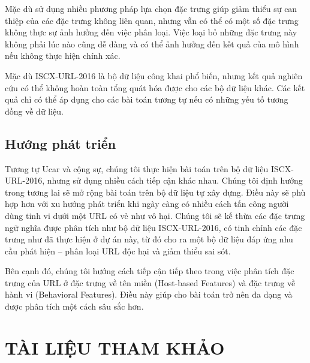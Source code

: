 \documentclass[13pt]{article}
\begin{document}
Mặc dù sử dụng nhiều phương pháp lựa chọn đặc trưng giúp giảm thiểu sự can thiệp của các đặc trưng không liên quan, nhưng vẫn có thể có một số đặc trưng không thực sự ảnh hưởng đến việc phân loại. Việc loại bỏ những đặc trưng này không phải lúc nào cũng dễ dàng và có thể ảnh hưởng đến kết quả của mô hình nếu không thực hiện chính xác.

Mặc dù ISCX-URL-2016 là bộ dữ liệu công khai phổ biến, nhưng kết quả nghiên cứu có thể không hoàn toàn tổng quát hóa được cho các bộ dữ liệu khác. Các kết quả chỉ có thể áp dụng cho các bài toán tương tự nếu có những yếu tố tương đồng về dữ liệu.

\subsection{Hướng phát triển}
Tương tự Ucar và cộng sự, chúng tôi thực hiện bài toán trên bộ dữ liệu ISCX-URL-2016, nhưng sử dụng nhiều cách tiếp cận khác nhau. Chúng tôi định hướng trong tương lai sẽ mở rộng bài toán trên bộ dữ liệu tự xây dựng. Điều này sẽ phù hợp hơn với xu hướng phát triển khi ngày càng có nhiều cách tấn công người dùng tinh vi dưới một URL có vẻ như vô hại. Chúng tôi sẽ kế thừa các đặc trưng ngữ nghĩa được phân tích như bộ dữ liệu ISCX-URL-2016, có tinh chỉnh các đặc trưng như đã thực hiện ở dự án này, từ đó cho ra một bộ dữ liệu đáp ứng nhu cầu phát hiện – phân loại URL độc hại và giảm thiểu sai sót.

Bên cạnh đó, chúng tôi hướng cách tiếp cận tiếp theo trong việc phân tích đặc trưng của URL ở đặc trưng về tên miền (Host-based Features) và đặc trưng về hành vi (Behavioral Features). Điều này giúp cho bài toán trở nên đa dạng và được phân tích một cách sâu sắc hơn.



\newpage
{}
\section*{TÀI LIỆU THAM KHẢO}
\renewcommand{\refname}{}
\end{document}
